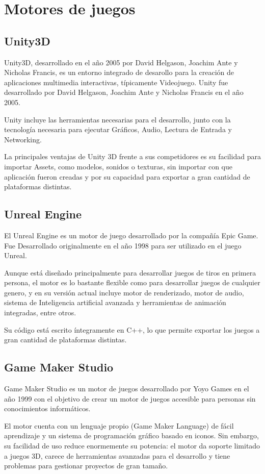 \section{Motores de juegos}
\subsection{Unity3D}
Unity3D, desarrollado en el año 2005 por David Helgason, Joachim Ante y Nicholas Francis, es un entorno integrado de desarollo para la creación de aplicaciones multimedia interactivas, típicamente Videojuego. 
Unity fue desarrollado por David Helgason, Joachim Ante y Nicholas Francis en el año 2005.

Unity incluye las herramientas necesarias para el desarrollo, junto con la tecnología necesaria para ejecutar Gráficos, Audio, Lectura de Entrada y Networking. 

La principales ventajas de Unity 3D frente a sus competidores es su facilidad para importar Assets, como modelos, sonidos o texturas, sin importar con que aplicación fueron creadas y por su capacidad para exportar a gran cantidad de plataformas distintas.

\subsection{Unreal Engine}
El Unreal Engine es un motor de juego desarrollado por la compañía Epic Game. Fue Desarrollado originalmente en el año 1998 para ser utilizado en el juego Unreal.

Aunque está diseñado principalmente para desarrollar juegos de tiros en primera persona, el motor es lo bastante flexible como para desarrollar juegos de cualquier genero, y en su versión actual incluye motor de renderizado, motor de audio, sistema de Inteligencia artificial avanzada y herramientas de animación integradas, entre otros.

Su código está escrito íntegramente en C++, lo que permite exportar los juegos a gran cantidad de plataformas distintas.

\subsection{Game Maker Studio}
Game Maker Studio es un motor de juegos desarrollado por Yoyo Games en el año 1999 con el objetivo de crear un motor de juegos accesible para personas sin conocimientos informáticos.

El motor cuenta con un lenguaje propio (Game Maker Language) de fácil aprendizaje y un sistema de programación gráfico basado en iconos. Sin embargo, su facilidad de uso reduce enormemente su potencia: el motor da soporte limitado a juegos 3D, carece de herramientas avanzadas para el desarrollo y tiene problemas para gestionar proyectos de gran tamaño.

